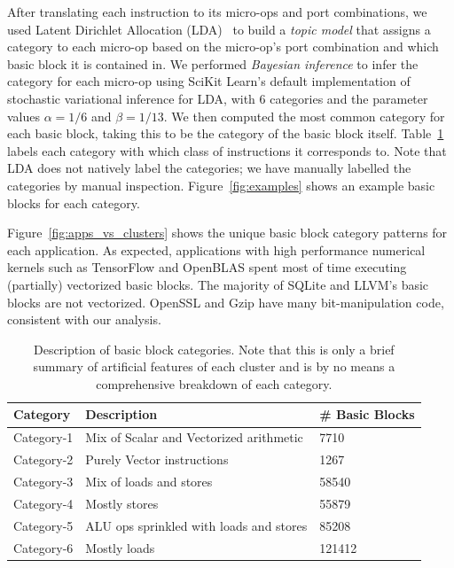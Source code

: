 After translating each instruction to its micro-ops and port combinations, we used Latent Dirichlet Allocation (LDA)~\cite{lda} to build a \emph{topic model}
that assigns a category to each micro-op based on the micro-op's port combination and which basic block it is contained in.
We performed \emph{Bayesian inference} to infer the category for each micro-op
using SciKit Learn's default implementation of stochastic variational inference for LDA\cite{lda},
with 6 categories and the parameter values $\alpha = 1/6$ and $\beta = 1/13$. 
We then computed the most common category for each basic block, taking this to be the category of the basic block itself.
Table~\ref{tab:categories} labels each category with which class of instructions it corresponds to.
Note that LDA does not natively label the categories;
we have manually labelled the categories by manual inspection.
Figure~\ref{fig:examples} shows an example basic blocks for each category.

Figure~\ref{fig:apps_vs_clusters} shows the unique basic block category patterns for each application.
As expected, applications with high performance numerical kernels such as TensorFlow and
OpenBLAS spent most of time executing (partially) vectorized basic blocks.
The majority of SQLite and LLVM's basic blocks are not vectorized.
OpenSSL and Gzip have many bit-manipulation code, consistent with our analysis.

\begin{table}
    \centering
\begin{tabular}{|p{}|p{}|p{}|} 
    \hline
    \textbf{Category} & \textbf{Description} & \textbf{\# Basic Blocks}\\
    \hline
    
    Category-1 & 
    Mix of Scalar and Vectorized arithmetic & 7710 
    \\
    \hline
    
    Category-2 &
    Purely Vector instructions & 1267
    \\
    \hline
    
    Category-3 &
    Mix of loads and stores & 58540 
    \\
    \hline
    
    Category-4 &
    Mostly stores & 55879 
    \\
    \hline
    
    Category-5 &
    ALU ops sprinkled with loads and stores & 85208 
    \\
    \hline
    
    Category-6 &
    Mostly loads & 121412
    \\
    \hline
\end{tabular}
\\
~\\
\caption{Description of basic block categories. Note that this is only a brief
summary of artificial features of each cluster and is by no means a comprehensive
breakdown of each category.}
\label{tab:categories}

\end{table}

